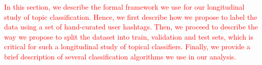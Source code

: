 
\textcolor{red}{In this section, we describe the formal framework we use for our longitudinal study of topic classification. Hence, we first describe how we propose to label the data using a set of hand-curated user hashtags. Then, we proceed to describe the way we propose to split the dataset into train, validation and test sets, which is critical for such a longitudinal study of topical classifiers. 
Finally, we provide a brief description of several classification algorithms we use in our analysis.
}



